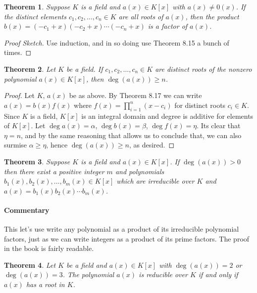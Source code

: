 \documentclass[letterpaper, 12pt]{article}
\newtheorem{thm}{Theorem}
\begin{document}
			\setcounter{thm}{16}
			\begin{thm}
			Suppose $K$ is a field and $a(x) \in K[x]$ with $a(x) \neq 0(x)$. 
			If the distinct elements $c_{1}, c_{2}, \dots , c_{n} \in K$ are all roots of $a(x)$, then the product $b(x) = (-c_{1} + x)( -c_{2} + x) \cdots (-c_{n} + x)$ is a factor of $a(x)$.
			\end{thm}
			\color{blue}
			\begin{proof}[Proof Sketch]
			Use induction, and in so doing use Theorem 8.15 a bunch of times.
			\end{proof}
			\color{black}

			\setcounter{thm}{18}
			\begin{thm}
			Let $K$ be a field. 
			If $c_{1}, c_{2}, \dots , c_{n} \in K$ are distinct roots of the nonzero polynomial $a(x) \in K[x]$, then $\deg(a(x)) \geq n$.
			\end{thm}
			\color{blue}
			\begin{proof}
			Let $K$, $a(x)$ be as above.
			By Theorem 8.17 we can write $a(x) = b(x)f(x)$ where $f(x) = \prod_{i=1}^{n} (x - c_{i})$ for distinct roots $c_{i} \in K$.
			Since $K$ is a field, $K[x]$ is an integral domain and degree is additive for elements of $K[x]$.
			Let $\deg{a(x)} = \alpha$, $\deg{b(x)} = \beta$, $\deg{f(x)} = \eta$.
			Its clear that $\eta = n$, and by the same reasoning that allows us to conclude that, we can also surmise $\alpha \geq \eta$, hence $\deg(a(x)) \geq n$, as desired.
			\end{proof}
			\color{black}

			\begin{thm}
			Suppose $K$ is a field and $a(x) \in K[x]$. 
			If $\deg(a(x)) > 0$ then there exist a positive integer $m$ and polynomials $b_{1}(x),b_{2}(x), \dots ,b_{m}(x) \in K[x]$ which are irreducible over $K$ and $a(x) = b_{1}(x)b_{2}(x)\cdots b_{m}(x)$.
			\end{thm}
			\paragraph{\color{blue}Commentary}
			\color{blue}
			This let's use write any polynomial as a product of its irreducible polynomial factors, just as we can write integers as a product of its prime factors.
			The proof in the book is fairly readable.
			\color{black}

			\setcounter{thm}{21}
			\begin{thm}
			Let $K$ be a field and $a(x) \in K[x]$ with $\deg(a(x)) = 2$ or $\deg(a(x)) = 3$. 
			The polynomial $a(x)$ is reducible over $K$ if and only if $a(x)$ has a root in $K$.
			\end{thm}
\end{document}
